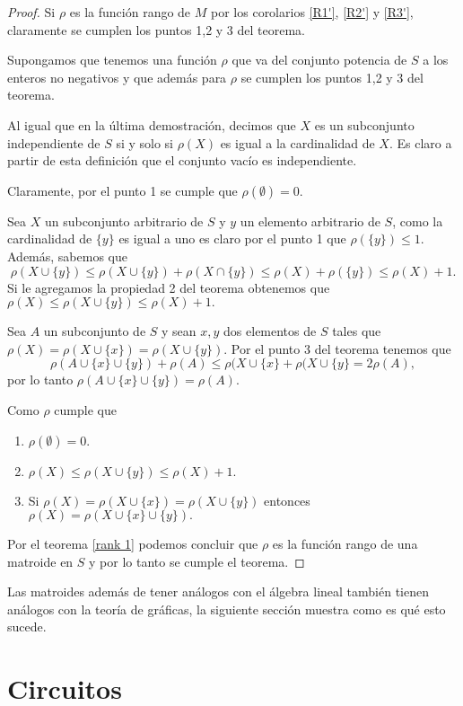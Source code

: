 \begin{proof}
Si $\rho $ es la función rango de $M$ por los corolarios \ref{R1'}, \ref{R2'} y \ref{R3'}, claramente se cumplen los puntos 1,2 y 3 del teorema. 

Supongamos que tenemos una función $\rho$ que va del conjunto potencia de $S$ a los enteros no negativos y que además para $\rho$ se cumplen los puntos 1,2 y 3 del teorema. 

Al igual que en la última demostración, decimos que $X$ es un subconjunto independiente de $S$ si y solo si $\rho(X)$ es igual a la cardinalidad de $X$. Es claro a partir de esta definición que el conjunto vacío es independiente. 

Claramente, por el punto 1 se cumple que $\rho(\emptyset) =0.$

Sea $X$ un subconjunto arbitrario de $S$ y $y$ un elemento arbitrario de $S$, como la cardinalidad de $\{y\}$ es igual a uno es claro por el punto 1 que $\rho(\{y\})\leq 1$. Además, sabemos que 
$$\rho(X \cup \{y\}) \leq \rho(X \cup \{y\}) + \rho(X \cap \{y\}) \leq \rho(X) + \rho(\{y\}) \leq \rho(X) +1. $$
Si le agregamos la propiedad 2 del teorema obtenemos que $\rho(X) \leq \rho(X \cup \{y\}) \leq \rho(X)+1.$ 

Sea $A$ un subconjunto de $S$ y sean $x,y$ dos elementos de $S$ tales que $\rho(X)=\rho(X \cup \{ x\}) =\rho(X \cup \{ y\}) .$ Por el punto 3 del teorema tenemos que 
$$\rho(A \cup \{x\} \cup \{y\}) + \rho(A) \leq \rho(X \cup \{ x\} + \rho(X \cup \{ y\} = 2 \rho(A),$$
por lo tanto $\rho(A \cup \{x\} \cup \{y\}) = \rho(A)$. 

Como $\rho$ cumple que 
\begin{enumerate}
\item $\rho(\emptyset) =0.$
\item $\rho(X) \leq \rho(X \cup \{y\}) \leq \rho(X)+1.$
\item Si $\rho(X)=\rho(X \cup \{ x\}) =\rho(X \cup \{ y\}) $ entonces $\rho(X)=\rho(X \cup \{ x\} \cup \{ y\}).$
\end{enumerate}
Por el teorema \ref{rank 1} podemos concluir que $\rho$ es la función rango de una matroide en $S$ y por lo tanto se cumple el teorema. 
\end{proof}

Las matroides además de tener análogos con el álgebra lineal también tienen análogos con la teoría de gráficas, la siguiente sección muestra como es qué esto sucede. 

\section{Circuitos}

